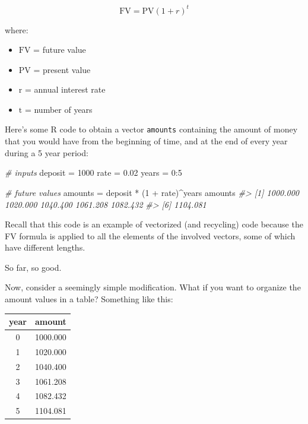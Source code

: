 \documentclass[
]{book}
\newenvironment{Shaded}{\begin{snugshade}}{\end{snugshade}}
\newcommand{\CommentTok}[1]{\textcolor[rgb]{0.56,0.35,0.01}{\textit{#1}}}
\newcommand{\DecValTok}[1]{\textcolor[rgb]{0.00,0.00,0.81}{#1}}
\newcommand{\FloatTok}[1]{\textcolor[rgb]{0.00,0.00,0.81}{#1}}
\newcommand{\NormalTok}[1]{#1}
\newcommand{\OtherTok}[1]{\textcolor[rgb]{0.56,0.35,0.01}{#1}}
\newcommand{\SpecialCharTok}[1]{\textcolor[rgb]{0.00,0.00,0.00}{#1}}
\providecommand{\tightlist}{%
  \setlength{\itemsep}{0pt}\setlength{\parskip}{0pt}}
\begin{document}
\[
\text{FV} = \text{PV} (1 + r)^t
\]

where:

\begin{itemize}
\tightlist
\item
  \(\text{FV}\) = future value
\item
  \(\text{PV}\) = present value
\item
  \(\text{r}\) = annual interest rate
\item
  \(\text{t}\) = number of years
\end{itemize}

Here's some R code to obtain a vector \texttt{amounts} containing the amount of money
that you would have from the beginning of time, and at the end of every year
during a 5 year period:

\begin{Shaded}
\begin{Highlighting}[]
\CommentTok{\# inputs}
\NormalTok{deposit }\OtherTok{=} \DecValTok{1000}
\NormalTok{rate }\OtherTok{=} \FloatTok{0.02}
\NormalTok{years }\OtherTok{=} \DecValTok{0}\SpecialCharTok{:}\DecValTok{5}

\CommentTok{\# future values}
\NormalTok{amounts }\OtherTok{=}\NormalTok{ deposit }\SpecialCharTok{*}\NormalTok{ (}\DecValTok{1} \SpecialCharTok{+}\NormalTok{ rate)}\SpecialCharTok{\^{}}\NormalTok{years}
\NormalTok{amounts}
\CommentTok{\#\textgreater{} [1] 1000.000 1020.000 1040.400 1061.208 1082.432}
\CommentTok{\#\textgreater{} [6] 1104.081}
\end{Highlighting}
\end{Shaded}

Recall that this code is an example of vectorized (and recycling) code because
the FV formula is applied to all the elements of the involved vectors, some
of which have different lengths.

So far, so good.

Now, consider a seemingly simple modification. What if you want to organize
the amount values in a table? Something like this:

\begin{longtable}[]{@{}cc@{}}
\toprule
year & amount \\
\midrule
\endhead
0 & 1000.000 \\
1 & 1020.000 \\
2 & 1040.400 \\
3 & 1061.208 \\
4 & 1082.432 \\
5 & 1104.081 \\
\bottomrule
\end{longtable}
\end{document}
